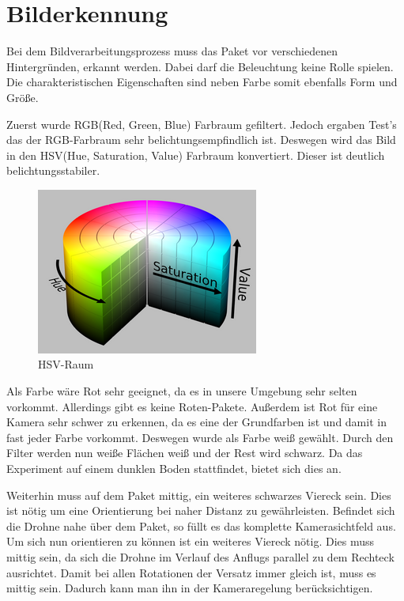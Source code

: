 \chapter{Bilderkennung}
\label{bilderkennung}
Bei dem Bildverarbeitungsprozess muss das Paket vor verschiedenen Hintergründen, erkannt werden. Dabei darf die Beleuchtung keine Rolle spielen. Die charakteristischen Eigenschaften sind neben Farbe somit ebenfalls Form und Größe.

Zuerst wurde RGB(Red, Green, Blue) Farbraum gefiltert. Jedoch ergaben Test's das der RGB-Farbraum sehr belichtungsempfindlich ist. Deswegen wird das Bild in den HSV(Hue, Saturation, Value) Farbraum konvertiert. Dieser ist deutlich belichtungsstabiler.
\begin{figure}[h]
	\begin{center}
	\includegraphics[scale=0.5]{"Grafiken/hsv_colorspace_zoom34.png"}
	\caption{HSV-Raum\protect\footnotemark}
	\label{fig:meine-grafik}
	\end{center}
\end{figure}

Als Farbe wäre Rot sehr geeignet, da es in unsere Umgebung sehr selten vorkommt. Allerdings gibt es keine Roten-Pakete. Außerdem ist Rot für eine Kamera sehr schwer zu erkennen, da es eine der Grundfarben ist und damit in fast jeder Farbe vorkommt. Deswegen wurde als Farbe weiß gewählt. Durch den Filter werden nun weiße Flächen weiß und der Rest wird schwarz. Da das Experiment auf einem dunklen Boden stattfindet, bietet sich dies an.

Weiterhin muss auf dem Paket mittig, ein weiteres schwarzes Viereck sein. Dies ist nötig um eine Orientierung bei naher Distanz zu gewährleisten. Befindet sich die Drohne nahe über dem Paket, so füllt es das komplette Kamerasichtfeld aus. Um sich nun orientieren zu können ist ein weiteres Viereck nötig. Dies muss mittig sein, da sich die Drohne im Verlauf des Anflugs parallel zu dem Rechteck ausrichtet. Damit bei allen Rotationen der Versatz immer gleich ist, muss es mittig sein. Dadurch kann man ihn in der Kameraregelung berücksichtigen.

